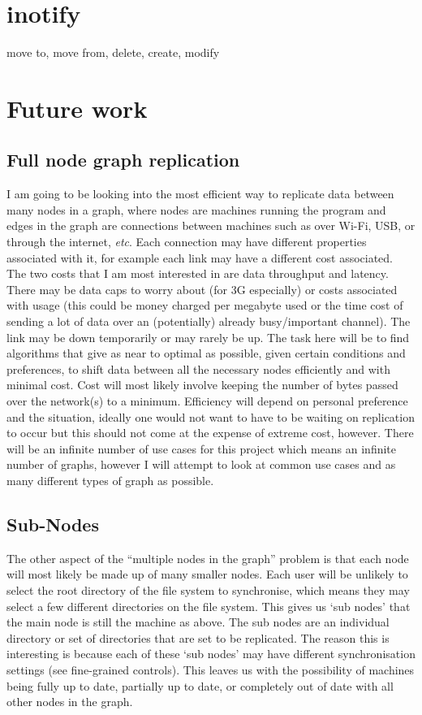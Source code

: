 \documentclass[12pt]{article}
\begin{document}
\section{inotify}
move to, move from, delete, create, modify

\section{Future work}
\subsection{Full node graph replication}
I am going to be looking into the most efficient way to
replicate data between many nodes in a graph, where nodes are machines
running the program and edges in the graph are connections
between machines such as over Wi-Fi, USB, or through the internet, \emph{etc}.
Each connection may have different properties associated
with it, for example each link may have a different cost
associated. The two costs that I am most interested in
are data throughput and latency. There may be data caps to worry about
(for 3G especially) or costs associated with usage
(this could be money charged per megabyte used or
the time cost of sending a lot of data over an (potentially)
already busy/important channel). The link may be down
temporarily or may rarely be up. The task here will be
to find algorithms that give as near to optimal as possible,
given certain conditions and preferences,
to shift data between all the necessary nodes
efficiently and with minimal cost. 
Cost will most likely involve keeping the number
of bytes passed over the network(s) to a minimum.
Efficiency will depend on personal preference and
the situation, ideally one would not want to have
to be waiting on replication to occur but this
should not come at the expense of extreme cost, however.
There will be an infinite number of use cases for this
project which means an infinite number of graphs,
however I will attempt to look at common use cases
and as many different types of graph as possible.

\subsection{Sub-Nodes}

The other aspect of the ``multiple nodes in the graph'' problem
is that each node will most likely be made up of many smaller nodes.
Each user will be unlikely to select the root directory of the
file system to synchronise, which means they may select a few
different directories on the file system. This gives us ‘sub nodes’
that the main node is still the machine as above. The sub nodes are
an individual directory or set of directories that are set to be replicated.
The reason this is interesting is because each of these ‘sub nodes’
may have different synchronisation settings (see fine-grained controls).
This leaves us with the possibility of machines being fully up to date,
partially up to date, or completely out of date with all other nodes in
the graph. 
\end{document}
